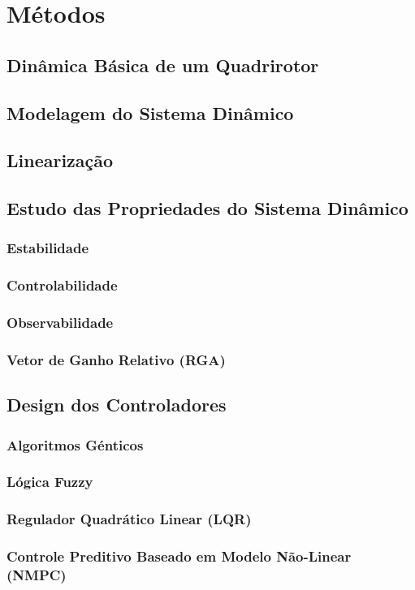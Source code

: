 \section{Métodos}

\subsection{Dinâmica Básica de um Quadrirotor}
\lipsum[1]

\subsection{Modelagem do Sistema Dinâmico}
\lipsum[1]

\subsection{Linearização}
\lipsum[1]

\subsection{Estudo das Propriedades do Sistema Dinâmico}
\lipsum[1]

\subsubsection{Estabilidade}
\lipsum[1]

\subsubsection{Controlabilidade}
\lipsum[1]

\subsubsection{Observabilidade}
\lipsum[1]

\subsubsection{Vetor de Ganho Relativo (RGA)}
\lipsum[1]

\subsection{Design dos Controladores}
\lipsum[1]

\subsubsection{Algoritmos Génticos}
\lipsum[1]

\subsubsection{Lógica Fuzzy}
\lipsum[1]

\subsubsection{Regulador Quadrático Linear (LQR)}
\lipsum[1]

\subsubsection{Controle Preditivo Baseado em Modelo Não-Linear (NMPC)}
\lipsum[1]
